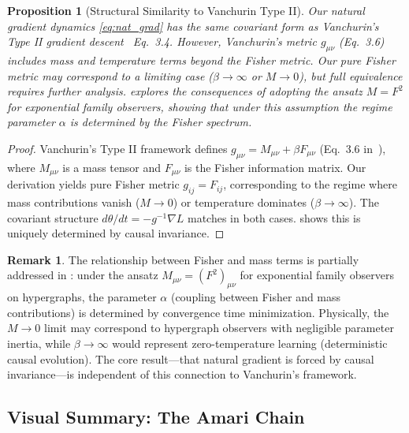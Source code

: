 \documentclass[11pt,a4paper]{article}
\theoremstyle{plain}
\newtheorem{proposition}[theorem]{Proposition}
\theoremstyle{definition}
\newtheorem{remark}[theorem]{Remark}
\theoremstyle{remark}
\begin{document}
\begin{proposition}[Structural Similarity to Vanchurin Type II]
\label{prop:vanchurin}
Our natural gradient dynamics \eqref{eq:nat_grad} has the same covariant form as Vanchurin's Type II gradient descent~\cite{vanchurin2025covariant} Eq.~3.4. However, Vanchurin's metric $g_{\mu\nu}$ (Eq.~3.6) includes mass and temperature terms beyond the Fisher metric. Our pure Fisher metric may correspond to a limiting case ($\beta \to \infty$ or $M \to 0$), but full equivalence requires further analysis.  explores the consequences of adopting the ansatz $M = F^2$ for exponential family observers, showing that under this assumption the regime parameter $\alpha$ is determined by the Fisher spectrum.
\end{proposition}
\begin{proof}
Vanchurin's Type II framework defines $g_{\mu\nu} = M_{\mu\nu} + \beta F_{\mu\nu}$ (Eq.~3.6 in~\cite{vanchurin2025covariant}), where $M_{\mu\nu}$ is a mass tensor and $F_{\mu\nu}$ is the Fisher information matrix. Our derivation yields pure Fisher metric $g_{ij} = F_{ij}$, corresponding to the regime where mass contributions vanish ($M \to 0$) or temperature dominates ($\beta \to \infty$). The covariant structure $d\theta/dt = -g^{-1} \nabla L$ matches in both cases.  shows this is uniquely determined by causal invariance.
\end{proof}

\begin{remark}
The relationship between Fisher and mass terms is partially addressed in : under the ansatz $M_{\mu\nu} = (F^2)_{\mu\nu}$ for exponential family observers on hypergraphs, the parameter $\alpha$ (coupling between Fisher and mass contributions) is determined by convergence time minimization. Physically, the $M \to 0$ limit may correspond to hypergraph observers with negligible parameter inertia, while $\beta \to \infty$ would represent zero-temperature learning (deterministic causal evolution). The core result---that natural gradient is forced by causal invariance---is independent of this connection to Vanchurin's framework.
\end{remark}

\subsection{Visual Summary: The Amari Chain}
\end{document}
